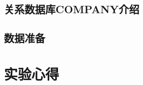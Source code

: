 \documentclass{ML}
\begin{document}
\subsection{关系数据库COMPANY介绍}

\subsection{数据准备}

\section{实验心得}


\end{document}
